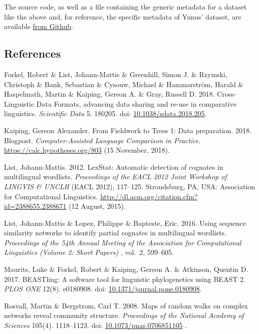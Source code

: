 \documentclass[
  a4paper,
  14pt,
  oneside,
  tablecaptionabove
]{scrbook}
\begin{document}
The source code, as well as a file containing the generic metadata for a
dataset like the above and, for reference, the specific metadata of
Yunus' dataset, are available
\href{https://github.com/Anaphory/matrix_to_beastling}{from Github}. 

\subsection*{References}

\nopagebreak\hangindent=0.7cm {\small Forkel, Robert \& List, Johann-Mattis \& Greenhill, Simon J. \&
Rzymski, Christoph \& Bank, Sebastian \& Cysouw, Michael \& Hammarström,
Harald \& Haspelmath, Martin \& Kaiping, Gereon A. \& Gray, Russell D.
2018. Cross-Linguistic Data Formats, advancing data sharing and re-use
in comparative linguistics. \emph{Scientific Data} 5. 180205. doi:
\href{https://doi.org/10.1038/sdata.2018.205}{10.1038/sdata.2018.205}. 
}

\nopagebreak\hangindent=0.7cm {\small Kaiping, Gereon Alexander. From Fieldwork to Trees 1: Data
preparation. 2018. Blogpost. \emph{Computer-Assisted Language Comparison
in Practice}.  \url{https://calc.hypotheses.org/803} (15 November,
2018). }

\nopagebreak\hangindent=0.7cm {\small List, Johann-Mattis. 2012. LexStat: Automatic detection of cognates in
multilingual wordlists. \emph{Proceedings of the EACL 2012 Joint
Workshop of LINGVIS \& UNCLH} (EACL 2012), 117--125. Stroudsburg, PA,
USA: Association for Computational Linguistics.
\url{http://dl.acm.org/citation.cfm?id=2388655.2388671} (12 August,
2015). }

\nopagebreak\hangindent=0.7cm {\small List, Johann-Mattis \& Lopez, Philippe \& Bapteste, Eric. 2016. Using
sequence similarity networks to identify partial cognates in
multilingual wordlists. \emph{Proceedings of the 54th Annual Meeting of
the Association for Computational Linguistics (Volume 2: Short Papers)}
, vol.~2, 599--605. }

\nopagebreak\hangindent=0.7cm {\small Maurits, Luke \& Forkel, Robert \& Kaiping, Gereon A. \& Atkinson,
Quentin D. 2017. BEASTling: A software tool for linguistic phylogenetics
using BEAST 2. \emph{PLOS ONE} 12(8). e0180908. doi:
\href{https://doi.org/10.1371/journal.pone.0180908}{10.1371/journal.pone.0180908}.
}

\nopagebreak\hangindent=0.7cm {\small Rosvall, Martin \& Bergstrom, Carl T. 2008. Maps of random walks on
complex networks reveal community structure. \emph{Proceedings of the
National Academy of Sciences} 105(4). 1118--1123. doi:
\href{https://doi.org/10.1073/pnas.0706851105}{10.1073/pnas.0706851105}
. }
\end{document}
